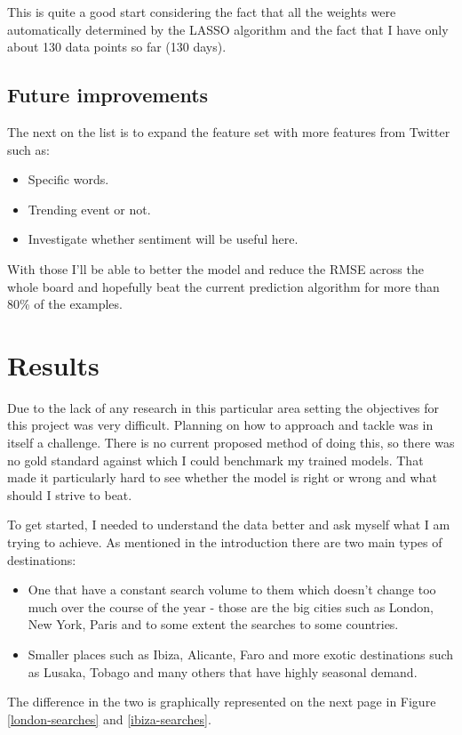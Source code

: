 \documentclass[minf,frontabs,twoside,singlespacing,parskip]{infthesis}
\begin{document}
This is quite a good start considering the fact that all the weights were automatically determined by the LASSO algorithm and the fact that I have only about 130 data points so far (130 days).

\section{Future improvements}

The next on the list is to expand the feature set with more features from Twitter such as:


\begin{itemize}
\item Specific words.
\item Trending event or not.
\item Investigate whether sentiment will be useful here.
\end{itemize}

With those I'll be able to better the model and reduce the RMSE across the whole board and hopefully beat the current prediction algorithm for more than 80\% of the examples.

\chapter{Results}


Due to the lack of any research in this particular area setting the objectives for this project was very difficult. Planning on how to approach and tackle was in itself a challenge. There is no current proposed method of doing this, so there was no gold standard against which I could benchmark my trained models. That made it particularly hard to see whether the model is right or wrong and what should I strive to beat.


To get started, I needed to understand the data better and ask myself what I am trying to achieve. As mentioned in the introduction there are two main types of destinations:

\begin{itemize}
\item One that have a constant search volume to them which doesn't change too much over the course of the year - those are the big cities such as London, New York, Paris and to some extent the searches to some countries. 
\item Smaller places such as Ibiza, Alicante, Faro and more exotic destinations such as Lusaka, Tobago and many others that have highly seasonal demand.
\end{itemize}
The difference in the two is graphically represented on the next page in Figure \ref{london-searches} and \ref{ibiza-searches}. 
\end{document}
